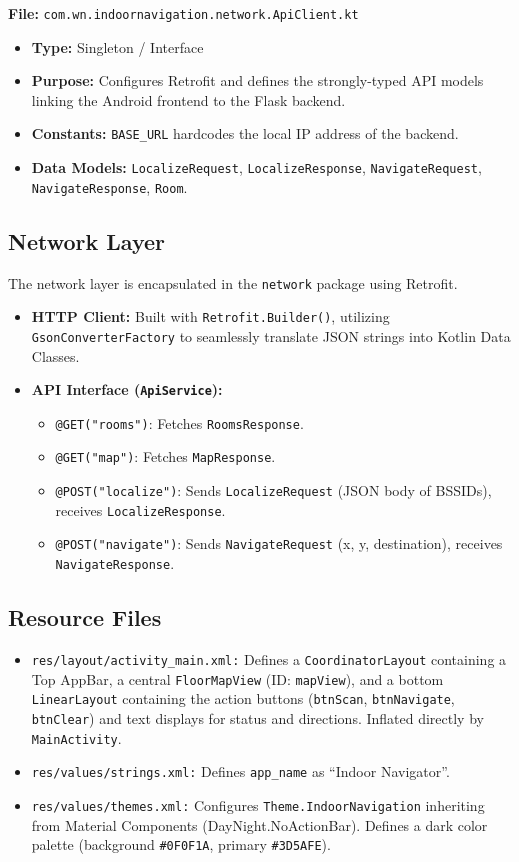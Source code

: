 \documentclass[11pt,a4paper]{article}
\begin{document}
\textbf{File:} \texttt{com.wn.indoornavigation.network.ApiClient.kt}
\begin{itemize}
\item \textbf{Type:} Singleton / Interface
\item \textbf{Purpose:} Configures Retrofit and defines the strongly-typed API models linking the Android frontend to the Flask backend.
\item \textbf{Constants:} \texttt{BASE\_URL} hardcodes the local IP address of the backend.
\item \textbf{Data Models:} \texttt{LocalizeRequest}, \texttt{LocalizeResponse}, \texttt{NavigateRequest}, \texttt{NavigateResponse}, \texttt{Room}.
\end{itemize}
\subsection{Network Layer}
The network layer is encapsulated in the \texttt{network} package using Retrofit.
\begin{itemize}
\item \textbf{HTTP Client:} Built with \texttt{Retrofit.Builder()}, utilizing \texttt{GsonConverterFactory} to seamlessly translate JSON strings into Kotlin Data Classes.
\item \textbf{API Interface (\texttt{ApiService}):}
\begin{itemize}
\item \texttt{@GET("rooms")}: Fetches \texttt{RoomsResponse}.
\item \texttt{@GET("map")}: Fetches \texttt{MapResponse}.
\item \texttt{@POST("localize")}: Sends \texttt{LocalizeRequest} (JSON body of BSSIDs), receives \texttt{LocalizeResponse}.
\item \texttt{@POST("navigate")}: Sends \texttt{NavigateRequest} (x, y, destination), receives \texttt{NavigateResponse}.
\end{itemize}
\end{itemize}
\subsection{Resource Files}
\begin{itemize}
\item \texttt{res/layout/activity\_main.xml:} Defines a \texttt{CoordinatorLayout} containing a Top AppBar, a central \texttt{FloorMapView} (ID: \texttt{mapView}), and a bottom \texttt{LinearLayout} containing the action buttons (\texttt{btnScan}, \texttt{btnNavigate}, \texttt{btnClear}) and text displays for status and directions. Inflated directly by \texttt{MainActivity}.
\item \texttt{res/values/strings.xml:} Defines \texttt{app\_name} as ``Indoor Navigator''.
\item \texttt{res/values/themes.xml:} Configures \texttt{Theme.IndoorNavigation} inheriting from Material Components (DayNight.NoActionBar). Defines a dark color palette (background \texttt{\#0F0F1A}, primary \texttt{\#3D5AFE}).
\end{itemize}
\end{document}
